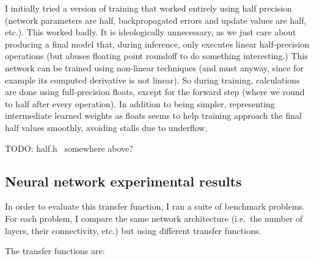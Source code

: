 \documentclass[twocolumn]{article}
\begin{document}
I initially tried a version of training that worked entirely using
half precision (network parameters are half, backpropagated errors and
update values are half, etc.). This worked badly. It is ideologically
unnecessary, as we just care about producing a final model that,
during inference, only executes linear half-precision operations (but
abuses floating point roundoff to do something interesting.) This
network can be trained using non-linear techniques (and must anyway,
since for example its computed derivative is not linear). So during
training, calculations are done using full-precision floats, except
for the forward step (where we round to half after every operation).
In addition to being simpler, representing intermediate learned
weights as floats seems to help training approach the final half
values smoothly, avoiding stalls due to underflow.

TODO: half.h~\cite{half} somewhere above?

\subsection{Neural network experimental results}
In order to evaluate this transfer function, I ran a suite of benchmark problems. For each problem, I compare the same network architecture (i.e.~the number of layers, their connectivity, etc.) but using different transfer functions.

The transfer functions are:
\end{document}
